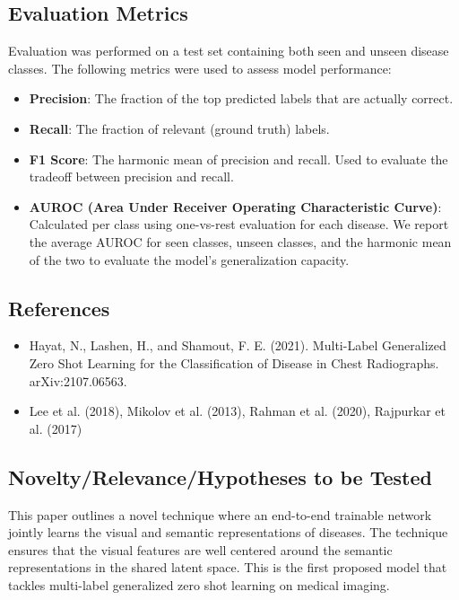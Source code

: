 \documentclass[letterpaper]{article} %
\begin{document}
\subsection{Evaluation Metrics}

Evaluation was performed on a test set containing both seen and unseen disease classes. The following metrics were used to assess model performance:

\begin{itemize}
    \item \textbf{Precision}: The fraction of the top predicted labels that are actually correct.
    \item \textbf{Recall}: The fraction of relevant (ground truth) labels.
    \item \textbf{F1 Score}: The harmonic mean of precision and recall. Used to evaluate the tradeoff between precision and recall.
    \item \textbf{AUROC (Area Under Receiver Operating Characteristic Curve)}: Calculated per class using one-vs-rest evaluation for each disease. We report the average AUROC for seen classes, unseen classes, and the harmonic mean of the two to evaluate the model's generalization capacity.
\end{itemize}

\subsection{References}
\begin{itemize}
    \item Hayat, N., Lashen, H., and Shamout, F. E. (2021). Multi-Label Generalized Zero Shot Learning for the Classification of Disease in Chest Radiographs. arXiv:2107.06563.
    \item Lee et al. (2018), Mikolov et al. (2013), Rahman et al. (2020), Rajpurkar et al. (2017)
\end{itemize}

\subsection{Novelty/Relevance/Hypotheses to be Tested}

This paper outlines a novel technique where an end-to-end trainable network jointly
learns the visual and semantic representations of diseases. The technique ensures that
the visual features are well centered around the semantic representations in the
shared latent space. This is the first proposed model that tackles multi-label
generalized zero shot learning on medical imaging.
\end{document}

